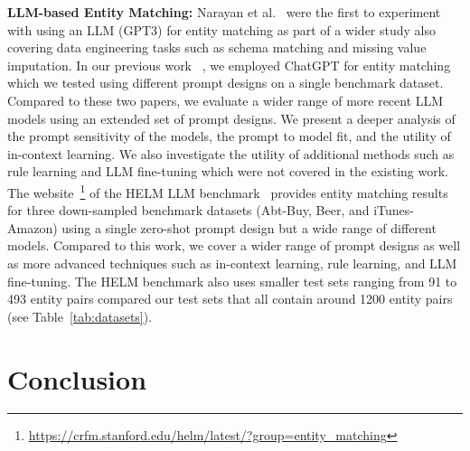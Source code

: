 \documentclass[sigconf,nonacm]{acmart}
\begin{document}
\textbf{LLM-based Entity Matching:} Narayan et al.~\cite{foundationalWrangleVLDB2022} were the first to experiment with using an LLM (GPT3) for entity matching as part of a wider study also covering data engineering tasks such as schema matching and missing value imputation. In our previous work ~\cite{peetersUsingChatGPTEntity2023a}, we employed ChatGPT for entity matching which we tested using different prompt designs on a single benchmark dataset. Compared to these two papers, we evaluate a wider range of more recent LLM models using an extended set of prompt designs. We present a deeper analysis of the prompt sensitivity of the models, the prompt to model fit, and the utility of in-context learning. We also investigate the utility of additional methods such as rule learning and LLM fine-tuning which were not covered in the existing work. The website~\footnote{\url{https://crfm.stanford.edu/helm/latest/?group=entity_matching}} of the HELM LLM benchmark~\cite{liang2022holistic} provides entity matching results for three down-sampled benchmark datasets (Abt-Buy, Beer, and iTunes-Amazon) using a single zero-shot prompt design but a wide range of different models. Compared to this work, we cover a wider range of prompt designs as well as more advanced techniques such as in-context learning, rule learning, and LLM fine-tuning. The HELM benchmark also uses smaller test sets ranging from 91 to 493 entity pairs compared our test sets that all contain around 1200 entity pairs (see Table~\ref{tab:datasets}). 

%
 \section{Conclusion}
\label{sec:conclusion}
\end{document}
